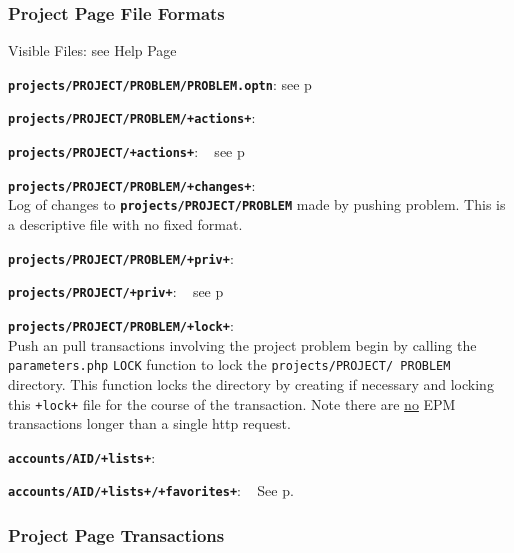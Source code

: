 \documentclass[12pt]{article}
\newenvironment{indpar}[1][0.4in]%
	{\begin{list}{}%
		     {\setlength{\itemsep}{0in}%
		      \setlength{\topsep}{0in}%
		      \setlength{\parsep}{1ex}%
		      \setlength{\labelwidth}{#1}%
		      \setlength{\leftmargin}{#1}%
		      \addtolength{\leftmargin}{\labelsep}}%
	 \item}%
	{\end{list}}
\newenvironment{itemlist}[1][0.2in]%
	{\begin{list}{}{\setlength{\labelwidth}{#1}%
		        \setlength{\leftmargin}{\labelwidth}%
		        \addtolength{\leftmargin}{+0.2in}%
		        \addtolength{\linewidth}{-\labelwidth}%
		        \addtolength{\linewidth}{-0.2in}%
		        \renewcommand{\makelabel}[1]{##1\hfill}}
	 \raggedright}%
	{\end{list}}
\newcommand{\TT}[1]{{\tt \bfseries #1}}
\newcommand{\pagref}[1]{p\pageref{#1}}
\begin{document}
\subsubsection{Project Page File Formats}

\begin{indpar}
\begin{itemlist}
\item[Visible Files:] see Help Page
\item[\TT{projects/PROJECT/PROBLEM/PROBLEM.optn}:] see \pagref{PROBLEM.OPTN}
\item[\TT{projects/PROJECT/PROBLEM/+actions+}:]
\item[\TT{projects/PROJECT/+actions+}:]\vspace*{-1ex} ~
    see \pagref{ACCOUNT-ACTIONS}
\item[\TT{projects/PROJECT/PROBLEM/+changes+}:]~
\label{PUSH-CHANGES} \\
    Log of changes to \TT{projects/PROJECT/PROBLEM} made by pushing problem.
    This is a descriptive file with no fixed format.
\item[\TT{projects/PROJECT/PROBLEM/+priv+}:]
\item[\TT{projects/PROJECT/+priv+}:]\vspace*{-1ex} ~
    see \pagref{PRIV}
\item[\TT{projects/PROJECT/PROBLEM/+lock+}:]~
\label{PROJECT/PROBLEM/LOCK} \\
Push an pull transactions involving the project problem
begin by calling the {\tt parameters.php} {\tt LOCK}
function to lock the {\tt projects/PROJECT/ PROBLEM} directory.
This function locks the
directory by creating if necessary and locking this {\tt +lock+} file
for the course of the transaction.  Note there are \underline{no}
EPM transactions longer than a single http request.
\item[\TT{accounts/AID/+lists+}:]
\item[\TT{accounts/AID/+lists+/+favorites+}:]\vspace*{-1ex}~
See \pagref{FAVORITES}.
\end{itemlist}
\end{indpar}


\subsubsection{Project Page Transactions}
\end{document}
